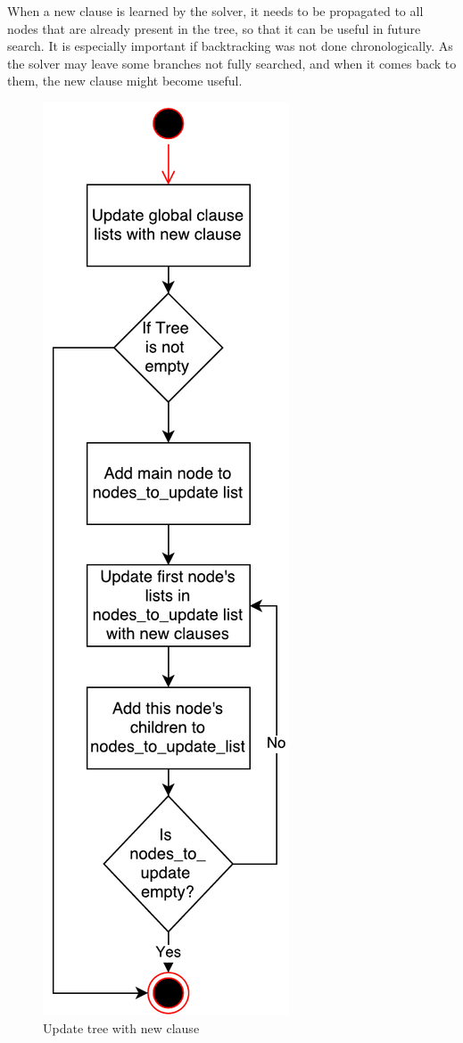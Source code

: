 \documentclass[12pt,english,pdflatex]{aghdpl}
\begin{document}
When a new clause is learned by the solver, it needs to be propagated to
all nodes that are already present in the tree, so that it can be useful in
future search. It is especially important if backtracking was
not done chronologically. As the solver may leave some branches not fully
searched, and when it comes back to them, the new clause might become
useful.

\begin{figure}[H]
\begin{centering}
\includegraphics[scale=0.7]{img/update_tree_with_clause}
\par\end{centering}
\caption{Update tree with new clause}
\end{figure}
\end{document}

